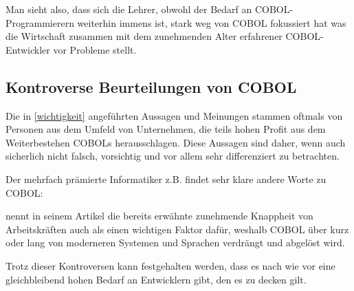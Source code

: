 Man sieht also, dass sich die Lehrer, obwohl der Bedarf an COBOL-Programmierern weiterhin immens ist, stark weg von COBOL fokussiert hat was die Wirtschaft zusammen mit dem zunehmenden Alter erfahrener COBOL-Entwickler vor Probleme stellt.

\subsection*{Kontroverse Beurteilungen von COBOL}
Die in \autoref{wichtigkeit} angeführten Aussagen und Meinungen stammen oftmals von Personen aus dem Umfeld von Unternehmen, die teils hohen Profit aus dem Weiterbestehen COBOLs herausschlagen. Diese Aussagen sind daher, wenn auch sicherlich nicht falsch, vorsichtig und vor allem sehr differenziert zu betrachten.

Der mehrfach prämierte Informatiker \citeauthor{edsger_wybe_dijkstra_how_1975} z.B. findet sehr klare andere Worte zu COBOL:  \cite{edsger_wybe_dijkstra_how_1975}

\citeauthor{florian_hamann_banken_2017} nennt in seinem Artikel  die bereits erwähnte zunehmende Knappheit von Arbeitskräften auch als einen wichtigen Faktor dafür, weshalb COBOL über kurz oder lang von moderneren Systemen und Sprachen verdrängt und abgelöst wird.

Trotz dieser Kontroversen kann festgehalten werden, dass es nach wie vor eine gleichbleibend hohen Bedarf an Entwicklern gibt, den es zu decken gilt.